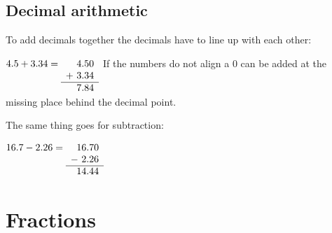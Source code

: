 \documentclass{article}
\begin{document}
\subsection{Decimal arithmetic}
To add decimals together the decimals have to line up with each other:

$4.5+3.34 = 
\begin{array}[t]{r}
    4.50 \\
+ \ 3.34 \\ \hline
    7.84
\end{array}$
If the numbers do not align a $0$ can be added at the missing place behind the decimal point.

The same thing goes for subtraction:

$16.7-2.26=
\begin{array}[t]{r}
  16.70 \\
- \ 2.26 \\ \hline
  14.44
\end{array}$

\section{Fractions}
\end{document}
